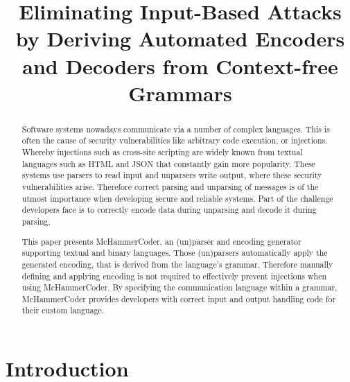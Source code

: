 \documentclass[conference]{IEEEtran}
\newcommand{\punchline}[1]{\textbf{Punch line: #1}}
\renewcommand{\punchline}[1]{}
\begin{document}
\title{Eliminating Input-Based Attacks by Deriving Automated Encoders and Decoders from Context-free Grammars}

\author{
\IEEEauthorblockA{Software Engineering, RWTH Aachen University, Germany\textsuperscript{2}\\
AXA Konzern AG, Germany\textsuperscript{2}
}
}


\maketitle

\IEEEpeerreviewmaketitle

\begin{abstract}
Software systems nowadays communicate via a number of complex languages.
This is often the cause of security vulnerabilities like arbitrary code execution, or injections.
Whereby injections such as cross-site scripting are widely known from textual languages such as HTML and JSON that constantly gain more popularity.
These systems use parsers to read input and unparsers write output, where these security vulnerabilities arise.
Therefore correct parsing and unparsing of messages is of the utmost importance when developing secure and reliable systems.
Part of the challenge developers face is to correctly encode data during unparsing and decode it during parsing.

This paper presents McHammerCoder, an (un)parser and encoding generator supporting textual and binary languages.
Those (un)parsers automatically apply the generated encoding, that is derived from the language's grammar.
Therefore manually defining and applying encoding is not required to effectively prevent injections when using McHammerCoder.
By specifying the communication language within a grammar, McHammerCoder provides developers with correct input and output handling code for their custom language.
\end{abstract}

\section{Introduction}
\punchline{String Concat is the problem}
\end{document}
